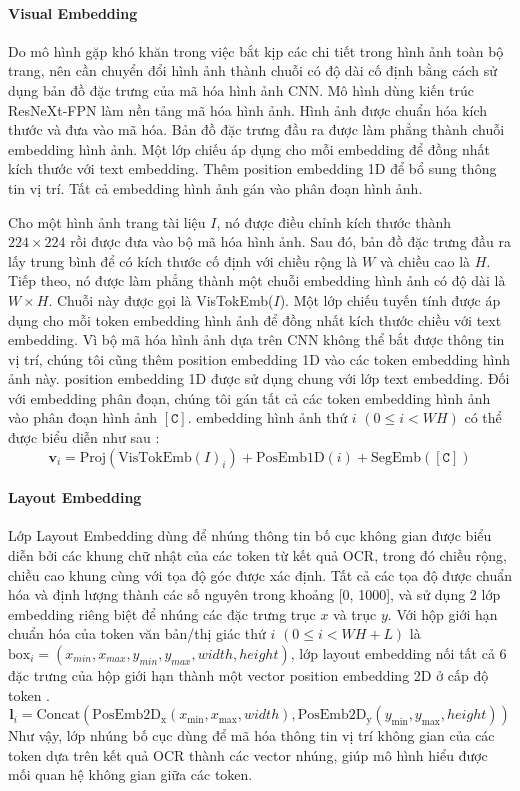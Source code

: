 \paragraph*{Visual Embedding}
Do mô hình gặp khó khăn trong việc bắt kịp các chi tiết trong hình ảnh toàn bộ trang, nên cần chuyển đổi hình ảnh thành chuỗi có độ dài cố định bằng cách sử dụng bản đồ đặc trưng của mã hóa hình ảnh CNN. Mô hình dùng kiến trúc ResNeXt-FPN làm nền tảng mã hóa hình ảnh. Hình ảnh được chuẩn hóa kích thước và đưa vào mã hóa. Bản đồ đặc trưng đầu ra được làm phẳng thành chuỗi embedding hình ảnh. Một lớp chiếu áp dụng cho mỗi embedding để đồng nhất kích thước với text embedding. Thêm position embedding 1D để bổ sung thông tin vị trí. Tất cả embedding hình ảnh gán vào phân đoạn hình ảnh.

Cho một hình ảnh trang tài liệu $I$, nó được điều chỉnh kích thước thành $224 \times 224$ rồi được đưa vào bộ mã hóa hình ảnh. Sau đó, bản đồ đặc trưng đầu ra lấy trung bình để có kích thước cố định với chiều rộng là $W$ và chiều cao là $H$. Tiếp theo, nó được làm phẳng thành một chuỗi embedding hình ảnh có độ dài là $W \times H$. Chuỗi này được gọi là VisTokEmb($I$). Một lớp chiếu tuyến tính được áp dụng cho mỗi token embedding hình ảnh để đồng nhất kích thước chiều với text embedding. Vì bộ mã hóa hình ảnh dựa trên CNN không thể bắt được thông tin vị trí, chúng tôi cũng thêm position embedding 1D vào các token embedding hình ảnh này. position embedding 1D được sử dụng chung với lớp text embedding. Đối với embedding phân đoạn, chúng tôi gán tất cả các token embedding hình ảnh vào phân đoạn hình ảnh $\mathtt{[C]}$.
embedding hình ảnh thứ $i$ $(0 \leq i < W H)$ có thể được biểu diễn như sau \cite{xu2022layoutlmv2}:
\[
    \mathbf{v}_i = \text{Proj}(\text{VisTokEmb}(I)_i) + \text{PosEmb1D}(i) + \text{SegEmb}([\mathtt{C}])    
\]

\paragraph*{Layout Embedding}
Lớp Layout Embedding dùng để nhúng thông tin bố cục không gian được biểu diễn bởi các khung chữ nhật của các token từ kết quả OCR, trong đó chiều rộng, chiều cao khung cùng với tọa độ góc được xác định. Tất cả các tọa độ được chuẩn hóa và định lượng thành các số nguyên trong khoảng [0, 1000], và sử dụng 2 lớp embedding riêng biệt để nhúng các đặc trưng trục $x$ và trục $y$. Với hộp giới hạn chuẩn hóa của token văn bản/thị giác thứ $i$ $(0 \leq i < W H + L)$ là $\text{box}_i = (x_{min}, x_{max}, y_{min}, y_{max}, width, height)$, lớp layout embedding nối tất cả 6 đặc trưng của hộp giới hạn thành một vector position embedding 2D ở cấp độ token \cite{xu2022layoutlmv2}.
\[
    \mathbf{l}_i = \text{Concat}(\text{PosEmb2D}_\text{x}(x_{\text{min}}, x_{\text{max}}, width), \text{PosEmb2D}_{\text{y}}(y_{\text{min}}, y_{\text{max}}, height))
\]
Như vậy, lớp nhúng bố cục dùng để mã hóa thông tin vị trí không gian của các token dựa trên kết quả OCR thành các vector nhúng, giúp mô hình hiểu được mối quan hệ không gian giữa các token.

